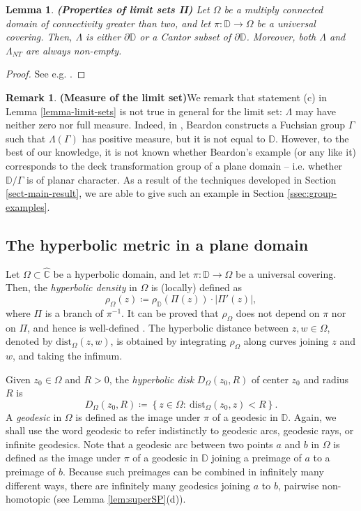 \documentclass[11pt,a4paper,reqno]{amsart}
\theoremstyle{plain}
\newtheorem{lemma}[thm]{Lemma}
\theoremstyle{definition}
\newtheorem{obs}[thm]{Remark}
\theoremstyle{plain}
\def\DD{\mathbb{D}}
\begin{document}
\begin{lemma}{\bf (Properties of limit sets II)}
	Let $ \Omega $ be a multiply connected domain of connectivity greater than two, and let $ \pi\colon \mathbb{D}\to\Omega $ be a universal covering. Then, 
$ \Lambda $ is either $ \partial\mathbb{D} $ or a Cantor subset of $ \partial\mathbb{D} $.
Moreover, both $ \Lambda $ and $\Lambda_{NT}$ are always non-empty.
\end{lemma}
\begin{proof}
	See  e.g. \cite[p. 76]{Hub06}. 
\end{proof}

\begin{obs}{\bf (Measure of the limit set)}\label{rmk:beardon}
	We remark that statement (c) in Lemma \ref{lemma-limit-sets} is not true in general for the limit set: $\Lambda$ may have neither zero nor full measure. Indeed, in \cite[p. 224]{Bea71}, Beardon constructs a Fuchsian group $\Gamma$ such that $\Lambda(\Gamma)$ has positive measure, but it is not equal to $\DD$. However, to the best of our knowledge, it is not known whether Beardon's example (or any like it) corresponds to the deck transformation group of a plane domain -- i.e. whether $\DD/\Gamma$ is of planar character. As a result of the techniques developed in Section \ref{sect-main-result}, we  are able to give such an example in Section \ref{ssec:group-examples}.
\end{obs}
\subsection*{The hyperbolic metric in a plane domain}
Let $ \Omega\subset\widehat{\mathbb{C}} $ be a hyperbolic domain, and let $ \pi\colon\mathbb{D}\to\Omega $ be a universal covering. Then, the \textit{hyperbolic density} in $ \Omega $ is (locally) defined as \[ \rho_\Omega(z)\coloneqq \rho_\mathbb{D}(\Pi(z))\cdot \left| \Pi'(z)\right| ,\]where $ \Pi $ is a branch of $ \pi^{-1} $. It can be proved that $ \rho_\Omega $ does not depend on $ \pi $ nor on $ \Pi $, and hence is well-defined  \cite[Thm. 10.3]{BeardonMinda}. The hyperbolic distance between $ z,w\in \Omega $, denoted by $ \textrm{dist}_\Omega(z,w) $,  is obtained by integrating $ \rho_\Omega $ along curves joining $ z $ and $ w $, and taking the infimum. 

Given $ z_0\in\Omega $ and $ R>0 $, the {\em hyperbolic disk} $ D_\Omega (z_0,R) $ of center $ z_0 $ and radius $ R $ is 
\[D_\Omega (z_0,R)\coloneqq \left\lbrace z\in\Omega\colon \ \textrm{dist}_\Omega(z_0,z)<R\right\rbrace .\]
A {\em geodesic}  in $\Omega$ is defined as the image under $\pi$ of a geodesic in $\DD$. Again, we shall use the word geodesic to refer indistinctly to geodesic arcs, geodesic rays, or infinite geodesics. Note that a geodesic arc between two points $a$ and $b$ in $\Omega$ is defined as the image under $\pi$ of a geodesic in $\DD$ joining a preimage of $a$ to a preimage of $b$. Because such preimages can be combined in infinitely many different ways, there are infinitely many geodesics joining $a$ to $b$, pairwise non-homotopic  (see  Lemma \ref{lem:superSP}(d)).
\end{document}
